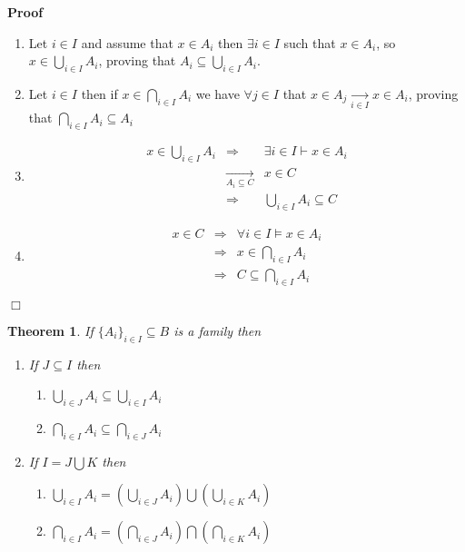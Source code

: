 \documentclass{book}
\newcommand{\Rightarrowlim}{\mathop{\rightarrow}\limits}
\newenvironment{proof}{\noindent\textbf{Proof\ }}{\hspace*{\fill}$\Box$\medskip}
\newtheorem{theorem}{Theorem}
\begin{document}
\begin{proof}
  
  \begin{enumerate}
    \item Let $i \in I$ and assume that $x \in A_i$ then $\exists i \in I$
    such that $x \in A_i$, so $x \in \bigcup_{i \in I} A_i$, proving that $A_i
    \subseteq \bigcup_{i \in I} A_i$.
    
    \item Let $i \in I$ then if $x \in \bigcap_{i \in I} A_i$ we have $\forall
    j \in I$ that $x \in A_j \Rightarrowlim_{i \in I} x \in A_i$, proving that
    $\bigcap_{i \in I} A_i \subseteq A_i$
    
    \item
    \begin{eqnarray*}
      x \in \bigcup_{i \in I} A_i & \Rightarrow & \exists i \in I \vdash x \in
      A_i\\
      & \Rightarrowlim_{A_i \subseteq C} & x \in C\\
      & \Rightarrow & \bigcup_{i \in I} A_i \subseteq C
    \end{eqnarray*}
    \item
    \begin{eqnarray*}
      x \in C & \Rightarrow & \forall i \in I \vDash x \in A_i\\
      & \Rightarrow & x \in \bigcap_{i \in I} A_i\\
      & \Rightarrow & C \subseteq \bigcap_{i \in I} A_i
    \end{eqnarray*}
  \end{enumerate}
\end{proof}

\begin{theorem}
  \label{family properties (2)}If $\{ A_i \}_{i \in I} \subseteq B$ is a
  family then
  \begin{enumerate}
    \item If $J \subseteq I$ then
    \begin{enumerate}
      \item $\bigcup_{i \in J} A_i \subseteq \bigcup_{i \in I} A_i$
      
      \item $\bigcap_{i \in I} A_i \subseteq \bigcap_{i \in J} A_i$
    \end{enumerate}
    \item If $I = J \bigcup K$ then
    \begin{enumerate}
      \item $\bigcup_{i \in I} A_i = \left( \bigcup_{i \in J} A_i \right)
      \bigcup \left( \bigcup_{i \in K} A_i \right)$
      
      \item $\bigcap_{i \in I} A_i = \left( \bigcap_{i \in J} A_i \right)
      \bigcap \left( \bigcap_{i \in K} A_i \right)$
    \end{enumerate}
  \end{enumerate}
\end{theorem}
\end{document}
